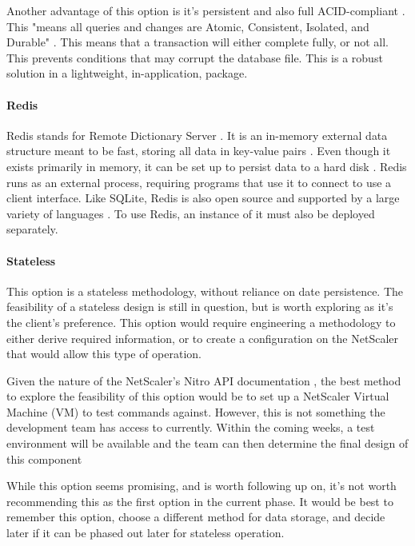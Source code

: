 Another advantage of this option is it's persistent and also full ACID-compliant \cite{sqlite}.
This "means all queries and changes are Atomic, Consistent, Isolated, and Durable" \cite{whatissqlite}.
This means that a transaction will either complete fully, or not all.
This prevents conditions that may corrupt the database file.
This is a robust solution in a lightweight, in-application, package.

\paragraph{Redis}
Redis stands for Remote Dictionary Server \cite{redisfaq}.
It is an in-memory external data structure meant to be fast, storing all data in key-value pairs \cite{redisfaq}.
Even though it exists primarily in memory, it can be set up to persist data to a hard disk \cite{redisintro}.
Redis runs as an external process, requiring programs that use it to connect to use a client interface.
Like SQLite, Redis is also open source and supported by a large variety of languages \cite{rediswhatandwhy}.
To use Redis, an instance of it must also be deployed separately.  

\paragraph{Stateless}
This option is a stateless methodology, without reliance on date persistence.
The feasibility of a stateless design is still in question, but is worth exploring as it's the client's preference.
This option would require engineering a methodology to either derive required information, or to create a configuration on the NetScaler that would allow this type of operation.

Given the nature of the NetScaler's Nitro API documentation \cite{nitro}, the best method to explore the feasibility of this option would be to set up a NetScaler Virtual Machine (VM) to test commands against.
However, this is not something the development team has access to currently.
Within the coming weeks, a test environment will be available and the team can then determine the final design of this component

While this option seems promising, and is worth following up on, it's not worth recommending this as the first option in the current phase.
It would be best to remember this option, choose a different method for data storage, and decide later if it can be phased out later for stateless operation.


